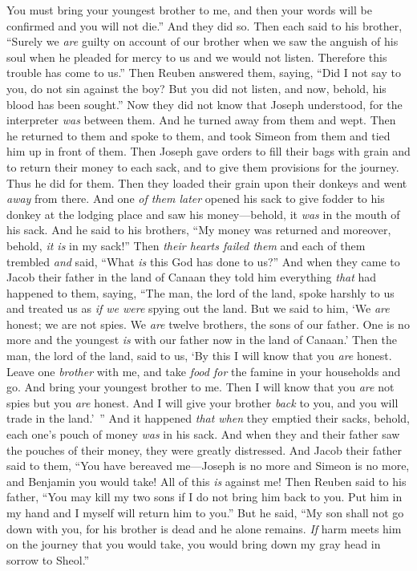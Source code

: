 \begin{biblechapter}
\verse You must bring your youngest brother to me, and then your words will be confirmed and you will not die.” And they did so.
\verse Then each said to his brother, “Surely we \textit{are} guilty on account of our brother when we saw the anguish of his soul when he pleaded for mercy to us and we would not listen. Therefore this trouble has come to us.”
\verse Then Reuben answered them, saying, “Did I not say to you, do not sin against the boy? But you did not listen, and now, behold, his blood has been sought.”
\verse Now they did not know that Joseph understood, for the interpreter \textit{was} between them.
\verse And he turned away from them and wept. Then he returned to them and spoke to them, and took Simeon from them and tied him up in front of them.
\verse Then Joseph gave orders to fill their bags with grain and to return their money to each sack, and to give them provisions for the journey. Thus he did for them.
\verse Then they loaded their grain upon their donkeys and went \textit{away} from there.
\verse And one \textit{of them later} opened his sack to give fodder to his donkey at the lodging place and saw his money—behold, it \textit{was} in the mouth of his sack.
\verse And he said to his brothers, “My money was returned and moreover, behold, \textit{it is} in my sack!” Then \textit{their hearts failed them} and each of them trembled \textit{and} said, “What \textit{is} this God has done to us?”
\verse And when they came to Jacob their father in the land of Canaan they told him everything \textit{that} had happened to them, saying,
\verse “The man, the lord of the land, spoke harshly to us and treated us as \textit{if we were} spying out the land.
\verse But we said to him, ‘We \textit{are} honest; we are not spies.
\verse We \textit{are} twelve brothers, the sons of our father. One is no more and the youngest \textit{is} with our father now in the land of Canaan.’
\verse Then the man, the lord of the land, said to us, ‘By this I will know that you \textit{are} honest. Leave one \textit{brother} with me, and take \textit{food for} the famine in your households and go.
\verse And bring your youngest brother to me. Then I will know that you \textit{are} not spies but you \textit{are} honest. And I will give your brother \textit{back} to you, and you will trade in the land.’ ”
\verse And it happened \textit{that when} they emptied their sacks, behold, each one’s pouch of money \textit{was} in his sack. And when they and their father saw the pouches of their money, they were greatly distressed.
\verse And Jacob their father said to them, “You have bereaved me—Joseph is no more and Simeon is no more, and Benjamin you would take! All of this \textit{is} against me!
\verse Then Reuben said to his father, “You may kill my two sons if I do not bring him back to you. Put him in my hand and I myself will return him to you.”
\verse But he said, “My son shall not go down with you, for his brother is dead and he alone remains. \textit{If} harm meets him on the journey that you would take, you would bring down my gray head in sorrow to Sheol.”
\end{biblechapter}

